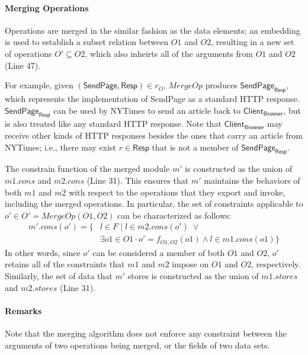 \paragraph{\textbf{Merging Operations}} Operations are merged in the
similar fashion as the data elements; an embedding is used to
establish a subset relation between $O1$ and $O2$, resulting in a new
set of operations $O' \subseteq O2$, which also inheirts all of the
arguments from $O1$ and $O2$ (Line 47).

For example, given $(\textsf{SendPage}, \textsf{Resp}) \in r_{O}$,
$MergeOp$ produces $\textsf{SendPage}_{\textsf{Resp}}$, which
represents the implementation of \textsf{SendPage} as a standard HTTP
response.  $\textsf{SendPage}_{\textsf{Resp}}$ can be used by
\textsf{NYTimes} to send an article back to
$\textsf{Client}_\textsf{Browser}$, but is also treated like any
standard HTTP response. Note that $\textsf{Client}_\textsf{Browser}$
may receive other kinds of HTTP responses besides the ones that carry
an article from \textsf{NYTimes}; i.e., there may exist $r \in
\textsf{Resp}$ that is not a member of $\textsf{SendPage}_{\textsf{Resp}}$.

The constrain function of the merged module $m'$ is constructed
as the union of $m1.cons$ and $m2.cons$ (Line 31). This ensures that $m'$
maintains the behaviors of both $m1$ and $m2$ with respect to the
operations that they export and invoke, including the merged
operations. In particular, the set of constraints applicable to $o' \in O' =
MergeOp(O1, O2)$ can be characterized as follows:
\begin{align*}
m'.cons(o') = \{& l \in F \;|\; l \in m2.cons(o') \; \lor \\
&\exists o1 \in O1 
\cdot o' = f_{O1, O2}(o1) \land l \in m1.cons(o1) \} 
\end{align*}
In other words, since $o'$ can be considered a member of both $O1$ and
$O2$, $o'$ retains all of the constraints that $m1$ and $m2$ impose
on $O1$ and $O2$, respectively. Similarly, the set of data that $m'$
stores is constructed as the union of $m1.stores$ and $m2.stores$ (Line 31).



\paragraph{\textbf{Remarks}} Note that the merging algorithm
does not enforce any constraint between the arguments of two
operations being merged, or the fields of two data sets. 

